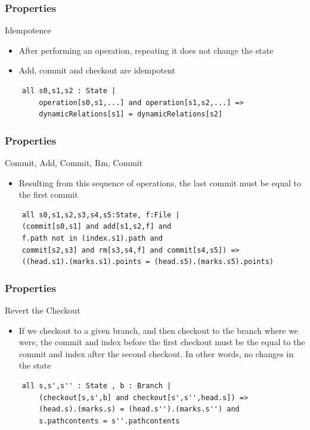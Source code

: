 \documentclass{beamer}
\begin{document}
\begin{frame}[fragile]
   \frametitle{Properties}
   \begin{block}{Idempotence}
      \begin{itemize}
         \item After performing an operation, repeating it does not change the state
         \item Add, commit and checkout are idempotent
      \end{itemize}
   \end{block}
   \scriptsize
   \begin{lstlisting}
	all s0,s1,s2 : State | 
		operation[s0,s1,...] and operation[s1,s2,...] => 
		dynamicRelations[s1] = dynamicRelations[s2]
   \end{lstlisting}
\end{frame}

\begin{frame}[fragile]
	\frametitle{Properties}
	\begin{block}{Commit, Add, Commit, Rm, Commit}
	\begin{itemize}
		\item Resulting from this sequence of operations, the last
		commit must be equal to the first commit
	\end{itemize}
	\end{block}
	\scriptsize
	\begin{lstlisting}
	all s0,s1,s2,s3,s4,s5:State, f:File |	
	(commit[s0,s1] and add[s1,s2,f] and 
	f.path not in (index.s1).path and
	commit[s2,s3] and rm[s3,s4,f] and commit[s4,s5]) => 
	((head.s1).(marks.s1).points = (head.s5).(marks.s5).points)
	\end{lstlisting}
	\normalsize
\end{frame}

\begin{frame}[fragile]
	\frametitle{Properties}
	\begin{block}{Revert the Checkout}
	\begin{itemize}
		\item If we checkout to a given branch, and then checkout to the
		branch where we were, the commit and index before the first checkout must
		be the equal to the commit and index after the second checkout. In other
		words, no changes in the state
	\end{itemize}
	\end{block}
	\scriptsize
	\begin{lstlisting}
	all s,s',s'' : State , b : Branch | 
		(checkout[s,s',b] and checkout[s',s'',head.s]) => 
		(head.s).(marks.s) = (head.s'').(marks.s'') and
		s.pathcontents = s''.pathcontents
	\end{lstlisting}
	\normalsize
\end{frame}
\end{document}
